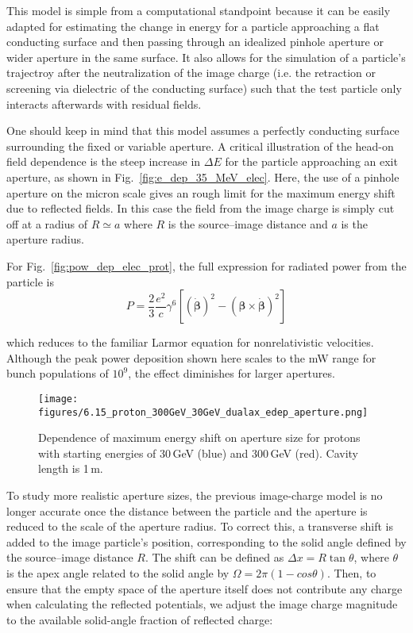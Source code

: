 \documentclass[reprint,
               amsmath,amssymb,nofootinbib, aps%
              ]{revtex4-2}
\begin{document}
This model is simple from a computational standpoint because it can be easily adapted for estimating the change in energy for a particle approaching a flat conducting surface and then passing through an idealized pinhole aperture or wider aperture in the same surface. It also allows for the simulation of a particle's trajectroy after the neutralization of the image charge (i.e. the retraction or screening via dielectric of the conducting surface) such that the test particle only interacts afterwards with residual fields.

One should keep in mind that this model assumes a perfectly conducting surface surrounding the fixed or variable aperture. A critical illustration of the head-on field dependence is the steep increase in $\Delta E$ for the particle approaching an exit aperture, as shown in Fig.~\ref{fig:e_dep_35_MeV_elec}. Here, the use of a pinhole aperture on the micron scale gives an rough limit for the maximum energy shift due to reflected fields. In this case the field from the image charge is simply cut off at a radius of $R\simeq a$ where $R$ is the source--image distance and $a$ is the aperture radius.

For Fig.~\ref{fig:pow_dep_elec_prot}, the full expression for radiated power from the particle is
\begin{equation}
P=\frac{2}{3} \frac{e^2}{c} \gamma^6\left[(\dot{\boldsymbol{\beta}})^2-(\boldsymbol{\beta} \times \dot{\boldsymbol{\beta}})^2\right]
\label{eq:lw_power}
\end{equation}

\noindent which reduces to the familiar Larmor equation for nonrelativistic velocities. Although the peak power deposition shown here scales to the mW range for bunch populations of $10^9$, the effect diminishes for larger apertures.

\begin{figure}[ht!]
    \centering
    \texttt{[image: figures/6.15\_proton\_300GeV\_30GeV\_dualax\_edep\_aperture.png]}
    \caption{Dependence of maximum energy shift on aperture size for protons with starting energies of 30\,GeV (blue) and 300\,GeV (red). Cavity length is 1\,m.}
\label{fig:e_dep_apertures}
\end{figure}

To study more realistic aperture sizes, the previous image-charge model is no longer accurate once the distance between the particle and the aperture is reduced to the scale of the aperture radius. To correct this, a transverse shift is added to the image particle's position, corresponding to the solid angle defined by the source--image distance $R$. The shift can be defined as $\Delta x = R \operatorname{tan}\theta$, where $\theta$ is the apex angle related to the solid angle by $\Omega = 2\pi (1-cos\theta)$. Then, to ensure that the empty space of the aperture itself does not contribute any charge when calculating the reflected potentials, we adjust the image charge magnitude to the available solid-angle fraction of reflected charge:
\end{document}
